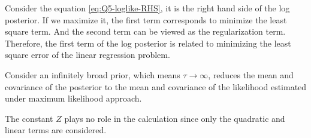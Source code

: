 \documentclass[12pt]{article}
\newenvironment{question}[2][Question]{\begin{trivlist}
\kern10pt
\item[\hskip \labelsep {\bfseries #1}\hskip \labelsep {\bfseries #2.}]}{\end{trivlist}}
\begin{document}
\begin{question}{5}
Consider the equation \eqref{eq:Q5-loglike-RHS}, it is the right hand side of the
log posterior. If we maximize it, the first term corresponds to minimize the
least square term. And the second term can be viewed as the regularization term.
Therefore, the first term of the log posterior is related to minimizing 
the least square error of the linear regression problem.

Consider an infinitely broad prior, which means $\tau \to \infty$, reduces the 
mean and covariance of the posterior to the mean and covariance of the likelihood
estimated under maximum likelihood approach.

The constant $Z$ plays no role in the calculation since only the quadratic and linear
 terms are considered.

\end{question}
\end{document}
